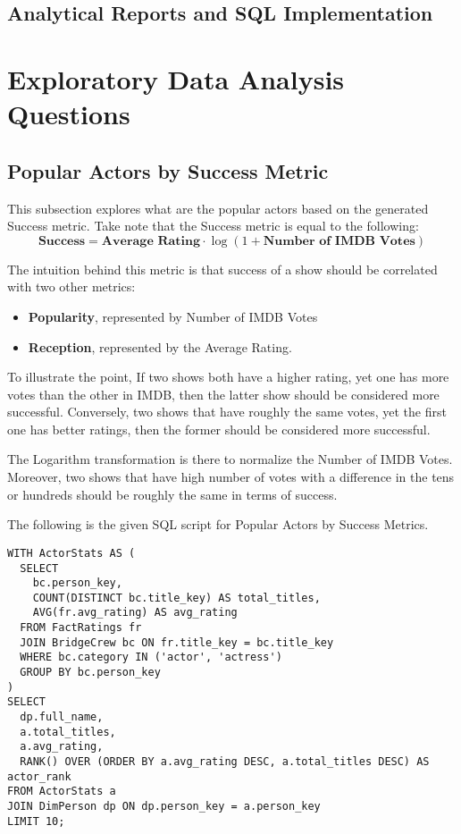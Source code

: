 \documentclass[sigconf, pbalance]{acmart}
\begin{document}
\subsection{Analytical Reports and SQL Implementation}

\section{Exploratory Data Analysis Questions}

\subsection{Popular Actors by Success Metric}

This subsection explores what are the popular actors based on the generated Success metric. Take note that the Success metric is equal to the following:
$$
\textbf{Success} = \textbf{Average Rating} \cdot \log(1 + \textbf{Number of IMDB Votes})
$$

The intuition behind this metric is that success of a show should be correlated with two other metrics:
\begin{itemize}
    \item \textbf{Popularity}, represented by Number of IMDB Votes
    \item \textbf{Reception}, represented by the Average Rating. 
\end{itemize}

To illustrate the point, If two shows both have a higher rating, yet one has more votes than the other in IMDB, then the latter show should be considered more successful. Conversely, two shows that have roughly the same votes, yet the first one has better ratings, then the former should be considered more successful. 

The Logarithm transformation is there to normalize the Number of IMDB Votes. Moreover, two shows that have high number of votes with a difference in the tens or hundreds should be roughly the same in terms of success.

The following is the given SQL script for Popular Actors by Success Metrics.
\begin{lstlisting}[style=SQLStyle]
WITH ActorStats AS (
  SELECT 
    bc.person_key,
    COUNT(DISTINCT bc.title_key) AS total_titles,
    AVG(fr.avg_rating) AS avg_rating
  FROM FactRatings fr
  JOIN BridgeCrew bc ON fr.title_key = bc.title_key
  WHERE bc.category IN ('actor', 'actress')
  GROUP BY bc.person_key
)
SELECT 
  dp.full_name,
  a.total_titles,
  a.avg_rating,
  RANK() OVER (ORDER BY a.avg_rating DESC, a.total_titles DESC) AS actor_rank
FROM ActorStats a
JOIN DimPerson dp ON dp.person_key = a.person_key
LIMIT 10;
\end{lstlisting}
\end{document}

